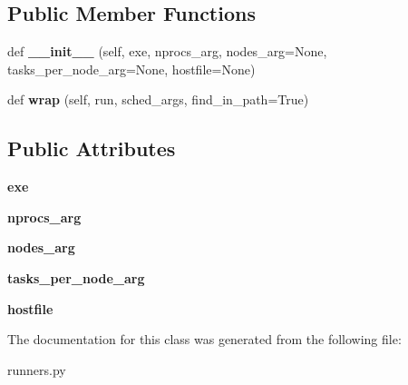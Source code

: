 \subsection*{Public Member Functions}
\begin{DoxyCompactItemize}
\item 
\mbox{\label{classcodar_1_1savanna_1_1runners_1_1_m_p_i_runner_a67662602e1fe9901e20e17a9f16b8259}} 
def {\bfseries \+\_\+\+\_\+init\+\_\+\+\_\+} (self, exe, nprocs\+\_\+arg, nodes\+\_\+arg=None, tasks\+\_\+per\+\_\+node\+\_\+arg=None, hostfile=None)
\item 
\mbox{\label{classcodar_1_1savanna_1_1runners_1_1_m_p_i_runner_a2eb86e6b8495ecf2361dc58e4b05c7c5}} 
def {\bfseries wrap} (self, run, sched\+\_\+args, find\+\_\+in\+\_\+path=True)
\end{DoxyCompactItemize}
\subsection*{Public Attributes}
\begin{DoxyCompactItemize}
\item 
\mbox{\label{classcodar_1_1savanna_1_1runners_1_1_m_p_i_runner_a7ccd767eb30cbd555f387e5b4d781ffa}} 
{\bfseries exe}
\item 
\mbox{\label{classcodar_1_1savanna_1_1runners_1_1_m_p_i_runner_aafcba954932f2160d43e820cf3abe6e1}} 
{\bfseries nprocs\+\_\+arg}
\item 
\mbox{\label{classcodar_1_1savanna_1_1runners_1_1_m_p_i_runner_ad139718b16183bd45520e166d6d2b9b9}} 
{\bfseries nodes\+\_\+arg}
\item 
\mbox{\label{classcodar_1_1savanna_1_1runners_1_1_m_p_i_runner_a58bd05be3e876f5a8f2522262ba934f7}} 
{\bfseries tasks\+\_\+per\+\_\+node\+\_\+arg}
\item 
\mbox{\label{classcodar_1_1savanna_1_1runners_1_1_m_p_i_runner_ad36885eab0821c149e8798ffbf567af4}} 
{\bfseries hostfile}
\end{DoxyCompactItemize}


The documentation for this class was generated from the following file\+:\begin{DoxyCompactItemize}
\item 
runners.\+py\end{DoxyCompactItemize}
